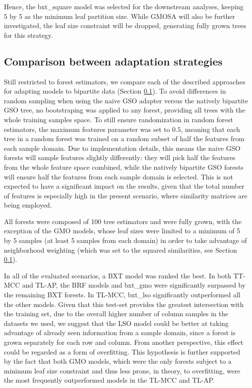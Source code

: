 
Hence, the bxt\_square model was selected for the downstream analyses, keeping 5 by 5 as the minimum leaf partition size. While GMOSA will also be further investigated, the leaf size constraint will be dropped, generating fully grown trees for this strategy.


\subsection{Comparison between adaptation strategies}

Still restricted to forest estimators, we compare each of the described approaches for adapting models to bipartite data (Section \ref{}). To avoid differences in random sampling when using the naive GSO adapter versus the natively bipartite GSO tree, no bootstraping was applied to any forest, providing all trees with the whole training samples space. To still ensure randomization in random forest estimators, the maximum features parameter was set to $0.5$, meaning that each tree in a random forest was trained on a random subset of half the features from each sample domain. Due to implementation details, this means the naive GSO forests will sample features slightly differently: they will pick half the features from the whole feature space combined, while the natively bipartite GSO forests will ensure half the features from each sample domain is selected. This is not expected to have a significant impact on the results, given that the total number of features is especially high in the present scenario, where similarity matrices are being employed. 

All forests were composed of 100 tree estimators and were fully grown, with the exception of the GMO models, whose leaf sizes were limited to a minimum of 5 by 5 samples (at least 5 samples from each domain) in order to take advantage of neighborhood weighting (which was set to the squared similarities, see Section \ref{}).

In all of the evaluated scenarios, a BXT model was ranked the best. In both TT-MCC and TL-AP, the BRF models and bxt\_gmo were significantly surpassed by the remaining BXT forests. In TL-MCC, bxt\_lso significantly outperformed all the other models. Given that this test-set provides the greatest intersection with the training set, due to the overall higher number of column samples in the datasets we used, we suggest that the LSO model could be better at taking advantage of already seen information from a sample domain, since a forest is grown separately for each row and column. From another perspective, this effect could be regarded as a form of overfitting. This hypothesis is further supported by the fact that both GMO models, which were the only forests subject to a minimum leaf size constraint and thus less prone, in theory, to overfitting, were the most frequently outperformed models in the TL-MCC and TL-AP.

